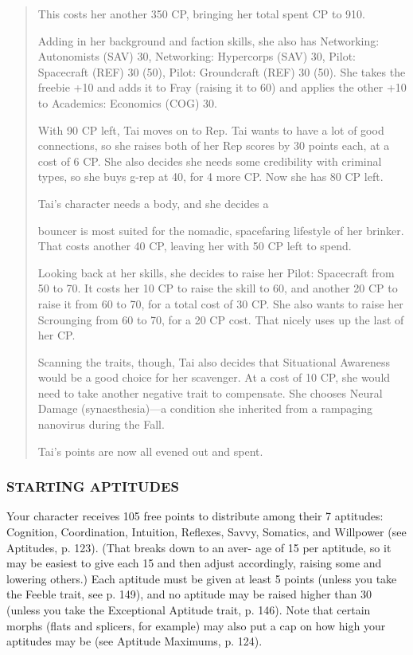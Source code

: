 \begin{quotation}
 This costs her another 350 CP, bringing her total spent
CP to 910.

 Adding in her background and faction skills, she also
has Networking: Autonomists (SAV) 30, Networking:
Hypercorps (SAV) 30, Pilot: Spacecraft (REF) 30 (50),
Pilot: Groundcraft (REF) 30 (50). She takes the freebie
+10 and adds it to Fray (raising it to 60) and applies the
other +10 to Academics: Economics (COG) 30.

 With 90 CP left, Tai moves on to Rep. Tai wants to
have a lot of good connections, so she raises both of her
Rep scores by 30 points each, at a cost of 6 CP. She also
decides she needs some credibility with criminal types,
so she buys g-rep at 40, for 4 more CP. Now she has 80
CP left.

 Tai’s character needs a body, and she decides a

bouncer is most suited for the nomadic, spacefaring
lifestyle of her brinker. That costs another 40 CP, leaving
her with 50 CP left to spend.

 Looking back at her skills, she decides to raise her
Pilot: Spacecraft from 50 to 70. It costs her 10 CP to
raise the skill to 60, and another 20 CP to raise it from
60 to 70, for a total cost of 30 CP. She also wants to
raise her Scrounging from 60 to 70, for a 20 CP cost.
That nicely uses up the last of her CP.

 Scanning the traits, though, Tai also decides that
Situational Awareness would be a good choice for her
scavenger. At a cost of 10 CP, she would need to take another negative trait to compensate. She chooses Neural
Damage (synaesthesia)—a condition she inherited from
a rampaging nanovirus during the Fall.

 Tai’s points are now all evened out and spent.
\end{quotation}  


\subsubsection{STARTING APTITUDES}
Your character receives 105 free points to distribute
among their 7 aptitudes: Cognition, Coordination,
Intuition, Reflexes, Savvy, Somatics, and Willpower
(see Aptitudes, p. 123). (That breaks down to an aver-
age of 15 per aptitude, so it may be easiest to give
each 15 and then adjust accordingly, raising some and
lowering others.) Each aptitude must be given at least
5 points (unless you take the Feeble trait, see p. 149),
and no aptitude may be raised higher than 30 (unless
you take the Exceptional Aptitude trait, p. 146). Note
that certain morphs (flats and splicers, for example)
may also put a cap on how high your aptitudes may
be (see Aptitude Maximums, p. 124).

